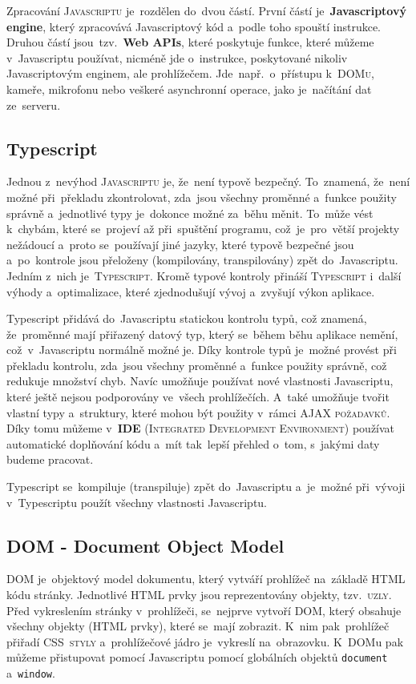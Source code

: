 \documentclass[14pt,a4paper]{article}
\begin{document}
        Zpracování \textsc{Javascriptu} je~rozdělen do~dvou částí. První částí je~\textbf{Javascriptový engine}, který zpracovává Javascriptový kód a~podle toho spouští instrukce. Druhou částí jsou~tzv.~\textbf{Web APIs}, které poskytuje funkce, které můžeme v~Javascriptu používat, nicméně jde o~instrukce, poskytované nikoliv Javascriptovým enginem, ale prohlížečem. Jde~např.~o~přístupu k~\textsc{DOMu}, kameře, mikrofonu nebo veškeré asynchronní operace, jako je~načítání dat ze~serveru. \parencite{mdn:js}

        \subsection{Typescript}
        Jednou z~nevýhod \textsc{Javascriptu} je, že~není typově bezpečný. To~znamená, že~není možné při~překladu zkontrolovat, zda~jsou všechny proměnné a~funkce použity správně a~jednotlivé typy je~dokonce možné za~běhu měnit. To~může vést k~chybám, které se~projeví až při~spuštění programu, což~je~pro~větší projekty nežádoucí a~proto se~používají jiné jazyky, které typově bezpečné jsou a~po~kontrole jsou přeloženy (kompilovány, transpilovány) zpět do~Javascriptu. Jedním z~nich je~\textsc{Typescript}. Kromě typové kontroly přináší \textsc{Typescript} i~další výhody a~optimalizace, které zjednodušují vývoj a~zvyšují výkon aplikace.

        Typescript přidává do~Javascriptu statickou kontrolu typů, což znamená, že~proměnné mají přiřazený datový typ, který se~během běhu aplikace nemění, což~v~Javascriptu normálně možné je. Díky kontrole typů je~možné provést při překladu kontrolu, zda~jsou všechny proměnné a~funkce použity správně, což redukuje množství chyb. Navíc umožňuje používat nové vlastnosti Javascriptu, které ještě nejsou podporovány ve~všech prohlížečích. A~také umožňuje tvořit vlastní typy a~struktury, které mohou být použity v~rámci \textsc{AJAX požadavků}. Díky tomu můžeme v~\textbf{IDE} (\textsc{Integrated Development Environment}) používat automatické doplňování kódu a~mít tak~lepší přehled o~tom, s~jakými daty budeme pracovat.

        Typescript se~kompiluje (transpiluje) zpět do~Javascriptu a~je~možné při~vývoji v~Typescriptu použít všechny vlastnosti Javascriptu. \parencite[Get started/TypeScript for the New Programmer]{TypeScript}

        \subsection{DOM - Document Object Model}
        DOM je~objektový model dokumentu, který vytváří prohlížeč na~základě HTML kódu stránky. Jednotlivé HTML prvky jsou reprezentovány objekty, tzv.~\textsc{uzly}. Před vykreslením stránky v~prohlížeči, se~nejprve vytvoří DOM, který obsahuje všechny objekty (HTML prvky), které se~mají zobrazit. K~nim pak~prohlížeč přiřadí \textsc{CSS~styly} a~prohlížečové jádro je~vykreslí na~obrazovku. K~DOMu pak můžeme přistupovat pomocí Javascriptu pomocí globálních objektů \texttt{document} a~\texttt{window}.
        
\end{document}
